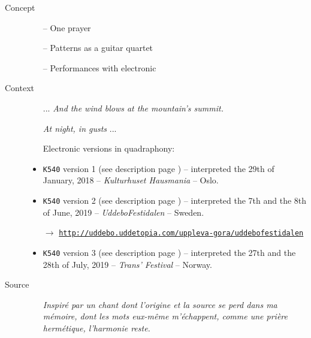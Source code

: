 \begin{description}
\item[Concept] \hfill 
\begin{itemize}
\item[--] One prayer
\item[--] Patterns as a guitar quartet
\item[--] Performances with electronic
\end{itemize}
\bigskip
\item[Context] \hfill 
\begin{itemize}
\item[] ... \textsl{And the wind blows at the mountain's summit.} 

\textsl{At night, in gusts} ...
\item[]
\item[] Electronic versions in quadraphony:
\item \texttt{K540} version 1 (see description page \pageref{k540v1}) -- interpreted the 29th of January, 2018 -- \textit{Kulturhuset Hausmania} -- Oslo.
\item \texttt{K540} version 2 (see description page \pageref{k540v2}) -- interpreted the 7th and the 8th of June, 2019 -- \textit{UddeboFestidalen} -- Sweden.

$\rightarrow$ \href{http://uddebo.uddetopia.com/uppleva-gora/uddebofestidalen}{\texttt{\small http://uddebo.uddetopia.com/uppleva-gora/uddebofestidalen}}

\item \texttt{K540} version 3 (see description page \pageref{k540v3}) -- interpreted the 27th and the 28th of July, 2019 -- \textit{Trans' Festival}  -- Norway.
\end{itemize}
\item[Source] \hfill 
\begin{itemize}
\item[] \textit{Inspir\'{e} par un chant dont l'origine et la source se perd dans ma m\'{e}moire, dont les mots eux-m\^{e}me m'\'{e}chappent, comme une pri\`{e}re herm\'{e}tique, l'harmonie reste.}
\end{itemize}


\end{description}

